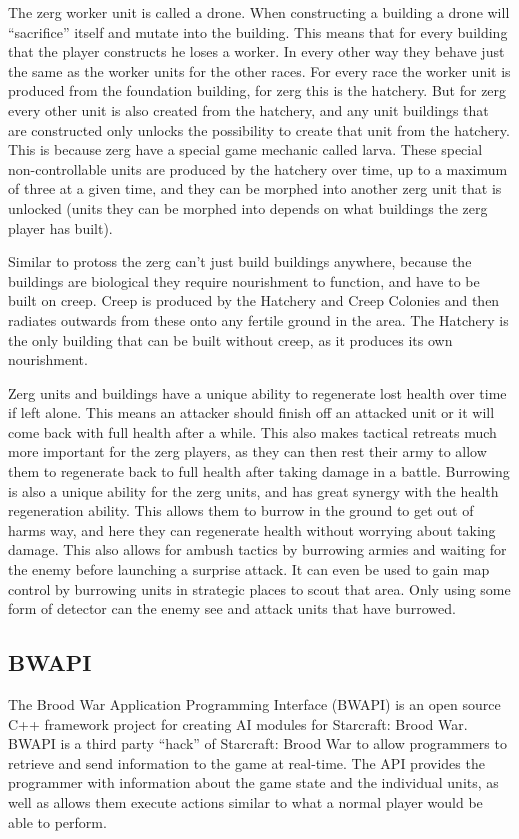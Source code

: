 The zerg worker unit is called a drone. When constructing a building a drone
will ``sacrifice'' itself and mutate into the building. This means that for
every building that the player constructs he loses a worker. In every other way
they behave just the same as the worker units for the other races. For every
race the worker unit is produced from the foundation building, for zerg this is
the hatchery. But for zerg every other unit is also created from the hatchery,
and any unit buildings that are constructed only unlocks the possibility to
create that unit from the hatchery. This is because zerg have a special game
mechanic called larva. These special non-controllable units are produced by the
hatchery over time, up to a maximum of three at a given time, and they can be
morphed into another zerg unit that is unlocked (units they can be morphed into
depends on what buildings the zerg player has built).

Similar to protoss the zerg can't just build buildings anywhere, because the
buildings are biological they require nourishment to function, and have to be
built on creep. Creep is produced by the Hatchery and Creep Colonies and then
radiates outwards from these onto any fertile ground in the area. The Hatchery
is the only building that can be built without creep, as it produces its own
nourishment. 

Zerg units and buildings have a unique ability to regenerate lost health over
time if left alone. This means an attacker should finish off an attacked unit or
it will come back with full health after a while. This also makes tactical
retreats much more important for the zerg players, as they can then rest their
army to allow them to regenerate back to full health after taking damage in a
battle. Burrowing is also a unique ability for the zerg units, and has great
synergy with the health regeneration ability. This allows them to burrow in the
ground to get out of harms way, and here they can regenerate health without
worrying about taking damage. This also allows for ambush tactics by burrowing
armies and waiting for the enemy before launching a surprise attack. It can even
be used to gain map control by burrowing units in strategic places to scout that
area. Only using some form of detector can the enemy see and attack units that
have burrowed. 

\subsection{BWAPI}
The Brood War Application Programming Interface (BWAPI)\cite{bwapi} is an open
source C++ framework project for creating AI modules for Starcraft: Brood War.
BWAPI is a third party ``hack'' of Starcraft: Brood War to allow programmers to
retrieve and send information to the game at real-time. The API provides the
programmer with information about the game state and the individual units, as
well as allows them execute actions similar to what a normal player would be
able to perform. 

